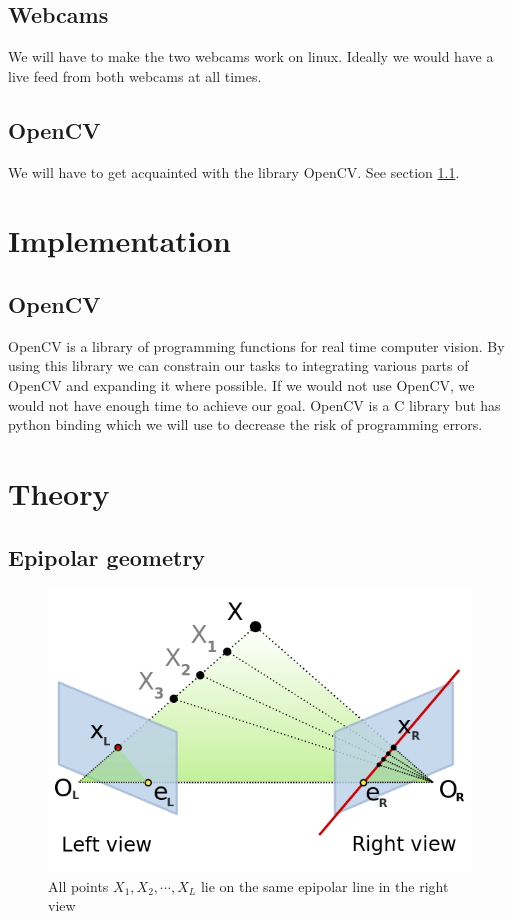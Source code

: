 \documentclass[a4paper]{article}
\begin{document}
\subsection{Webcams}
We will have to make the two webcams work on linux. Ideally we would have a live
feed from both webcams at all times.

\subsection{OpenCV}
We will have to get acquainted with the library OpenCV. See section
\ref{opencv}.

\section{Implementation}

\subsection{OpenCV}
\label{opencv}
OpenCV is a library of programming functions for real time computer vision. By using this library we can constrain our tasks to integrating various parts of OpenCV and expanding it where possible. If we would not use OpenCV, we would not have enough time to achieve our goal. OpenCV is a C library but has python binding which we will use to decrease the risk of programming errors.

\section{Theory}

\subsection{Epipolar geometry}
\label{epipolar}

\begin{figure}[h!]
  \label{fig:epipole}
  \centering
  \includegraphics[width=1.0\textwidth]{Epipolar_geometry}
  \caption{All points $X_{1}, X_{2}, \cdots, X_{L}$ lie on the same epipolar line in the right view}
\end{figure}
\end{document}
